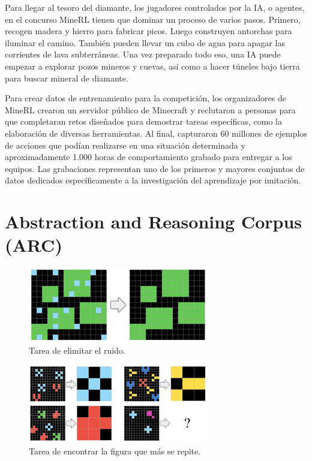 Para llegar al tesoro del diamante, los jugadores controlados por la IA, o agentes, en el concurso MineRL tienen que dominar un proceso de varios pasos. Primero, recogen madera y hierro para fabricar picos. Luego construyen antorchas para iluminar el camino. También pueden llevar un cubo de agua para apagar las corrientes de lava subterráneas. Una vez preparado todo eso, una IA puede empezar a explorar pozos mineros y cuevas, así como a hacer túneles bajo tierra para buscar mineral de diamante.

Para crear datos de entrenamiento para la competición, los organizadores de MineRL crearon un servidor público de Minecraft y reclutaron a personas para que completaran retos diseñados para demostrar tareas específicas, como la elaboración de diversas herramientas. Al final, capturaron 60 millones de ejemplos de acciones que podían realizarse en una situación determinada y aproximadamente 1.000 horas de comportamiento grabado para entregar a los equipos. Las grabaciones representan uno de los primeros y mayores conjuntos de datos dedicados específicamente a la investigación del aprendizaje por imitación.

\section{Abstraction and Reasoning Corpus (ARC)}\label{section:state-of-the-art:arc}

\begin{figure}[ht!]
    \centering
    \includegraphics[width=0.7\textwidth]{Graphics/arc-2.png}
    \caption{Tarea de elimitar el ruido.}
    \label{fig:arc-1}
\end{figure}

\begin{figure}[ht!]
    \centering
    \includegraphics[width=0.7\textwidth]{Graphics/arc-1.png}
    \caption{Tarea de encontrar la figura que más se repite.}
    \label{fig:arc-2}
\end{figure}


